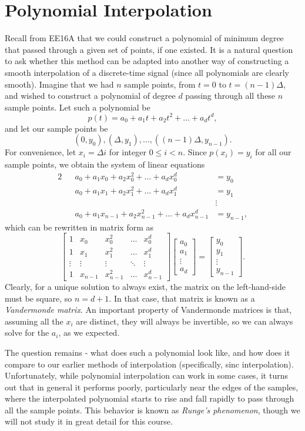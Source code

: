 \documentclass[letterpaper]{article}
\theoremstyle{remark}
\newcommand{\mat}[1]{\ensuremath{\begin{bmatrix}#1\end{bmatrix}}}
\newcommand{\eqn}[1]{\begin{alignat*}{2}#1\end{alignat*}}
\begin{document}
\section{Polynomial Interpolation}
Recall from EE16A that we could construct a polynomial of minimum degree that passed through a given set of points, if one existed. It is a natural question to ask whether this method can be adapted into another way of constructing a smooth interpolation of a discrete-time signal (since all polynomials are clearly smooth). Imagine that we had $n$ sample points, from $t = 0$ to $t = (n-1)\Delta$, and wished to construct a polynomial of degree $d$ passing through all these $n$ sample points. Let such a polynomial be
\[
    p(t) = a_0 + a_1t + a_2t^2 + \ldots + a_dt^d,
\]
and let our sample points be
\[
    (0, y_0), (\Delta, y_1), \ldots, ((n-1)\Delta, y_{n-1}).
\]
For convenience, let $x_i = \Delta i$ for integer $0 \le i < n$. Since $p(x_i) = y_i$ for all our sample points, we obtain the system of linear equations
\eqn{
    && a_0 + a_1x_0 + a_2x_0^2 + \ldots + a_dx_0^d &= y_0 \\
    && a_0 + a_1x_1 + a_2x_1^2 + \ldots + a_dx_1^d &= y_1 \\
    &&& \vdots \\
    && a_0 + a_1x_{n-1} + a_2x_{n-1}^2 + \ldots + a_dx_{n-1}^d &= y_{n-1},
}
which can be rewritten in matrix form as
\[
    \mat{
        1 & x_0 & x_0^2 & \ldots & x_0^d \\
        1 & x_1 & x_1^2 & \ldots & x_1^d \\ 
        \vdots & \vdots & \vdots & \ddots & \vdots \\ 
        1 & x_{n-1} & x_{n-1}^2 & \ldots & x_{n-1}^d
    } \mat{a_0 \\ a_1 \\ \vdots \\ a_d} = \mat{y_0 \\ y_1 \\ \vdots \\ y_{n-1}}.
\]
Clearly, for a unique solution to always exist, the matrix on the left-hand-side must be square, so $n = d + 1$. In that case, that matrix is known as a \emph{Vandermonde matrix}. An important property of Vandermonde matrices is that, assuming all the $x_i$ are distinct, they will always be invertible, so we can always solve for the $a_i$, as we expected.

The question remains - what does such a polynomial look like, and how does it compare to our earlier methods of interpolation (specifically, sinc interpolation). Unfortunately, while polynomial interpolation can work in some cases, it turns out that in general it performs poorly, particularly near the edges of the samples, where the interpolated polynomial starts to rise and fall rapidly to pass through all the sample points. This behavior is known as \emph{Runge's phenomenon}, though we will not study it in great detail for this course.
\end{document}
